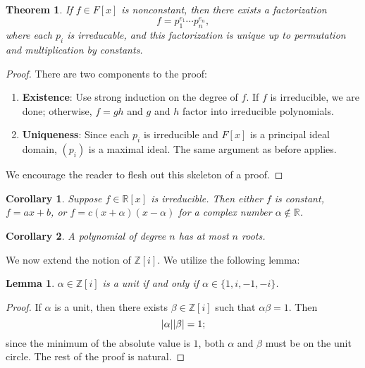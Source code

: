 \documentclass[11pt]{article}
\newtheorem{theorem}{Theorem}
\newtheorem{lemma}{Lemma}
\newtheorem{corollary}{Corollary}
\begin{document}
\begin{adjustwidth}{0.5cm}{}
  \begin{theorem}
    If $f \in F[x]$ is nonconstant, then there exists a factorization 
    \[
      f = p_{1}^{e_{1}} \cdots p_{n}^{e_{n}},
    \]
    where each $p_{i}$ is irreducable, and this factorization is unique up to permutation and multiplication by constants.
  \end{theorem}
  \begin{proof}
    There are two components to the proof:
    \begin{enumerate}
      \item \textbf{Existence}: Use strong induction on the degree of $f$. If $f$ is irreducible, we are done; otherwise, $f = gh$ and $g$ and $h$ factor into irreducible polynomials.
      \item \textbf{Uniqueness}: Since each $p_{i}$ is irreducible and $F[x]$ is a principal ideal domain, $(p_{i})$ is a maximal ideal. The same argument as before applies.
    \end{enumerate}
    We encourage the reader to flesh out this skeleton of a proof.
  \end{proof}
  \begin{corollary}
    Suppose $f \in \mathbb{R}[x]$ is irreducible. Then either $f$ is constant, $f = ax + b$, or $f = c(x + \alpha)(x - \alpha)$ for a complex number $\alpha \notin \mathbb{R}$.
  \end{corollary}
  \null
  \begin{corollary}
    A polynomial of degree $n$ has at most $n$ roots.
  \end{corollary}
  \null
\end{adjustwidth}

We now extend the notion of $\mathbb{Z}[i]$. We utilize the following lemma:

\begin{adjustwidth}{0.5cm}{}
  \begin{lemma}
    $\alpha \in \mathbb{Z}[i]$ is a unit if and only if $\alpha \in \{ 1, i, -1, -i \}$.
  \end{lemma}
  \begin{proof}
    If $\alpha$ is a unit, then there exists $\beta \in \mathbb{Z}[i]$ such that $\alpha \beta = 1$. Then
    \[
      \abs{\alpha} \abs{\beta} = 1;
    \]
    since the minimum of the absolute value is $1$, both $\alpha$ and $\beta$ must be on the unit circle. The rest of the proof is natural.
  \end{proof}
\end{adjustwidth}
\end{document}
